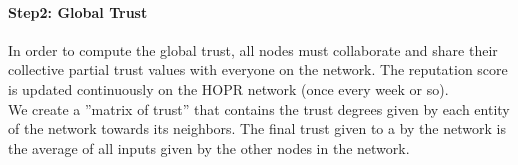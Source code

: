 \paragraph{Step2: Global Trust}
In order to compute the global trust, all nodes must collaborate and share their collective partial trust values with everyone on the network. 
The reputation score is updated continuously on the HOPR network (once every week or so). 
\\We create a ”matrix of trust” that contains the trust degrees given by each entity of the network towards its neighbors. 
The final trust given to a by the network is the average of all inputs given by the other nodes in the network.
